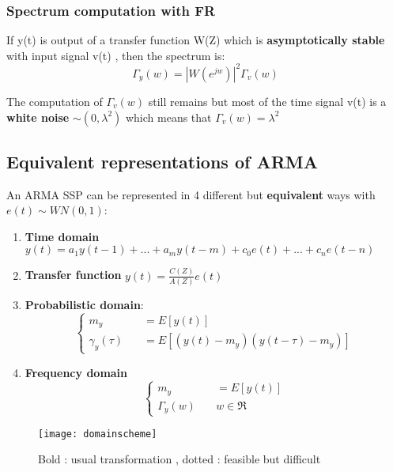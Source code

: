 \subsubsection{Spectrum computation with FR}
If y(t) is output of a transfer function W(Z) which is \textbf{asymptotically stable} with input signal v(t) , then the spectrum is:
\[
 \boxed{ \Gamma_y(w) = |W(e^{jw})|^2 \Gamma_v(w)}
\]

The computation of $\Gamma_v(w)$ still remains but most of the time signal v(t) is a \textbf{white noise} $\sim (0,\lambda^2)$ which means that $\Gamma_v(w) = \lambda^2$


\subsection{Equivalent representations of ARMA}
An ARMA SSP can be represented in 4 different but \textbf{equivalent} ways with $e(t) 
\sim WN(0,1)$:
\begin{enumerate}
\item \textbf{Time domain} $ y(t) = a_1y(t-1)+...+a_my(t-m) +c_0e(t)+...+c_ne(t-n)$
\item \textbf{Transfer function} $ y(t) = \frac{C(Z)}{A(Z)} e(t) $
\item \textbf{Probabilistic domain}:
 \[  
  \begin{cases}
    m_y       & \quad = E[y(t)]\\
    \gamma_y(\tau)  & \quad =  E[(y(t)-m_y)(y(t-\tau)-m_y)]
  \end{cases}
\]
\item \textbf{Frequency domain} 
 \[  
  \begin{cases}
    m_y       & \quad = E[y(t)]\\
    \Gamma_y(w)  & \quad w \in \Re
  \end{cases}
\]
\end{enumerate}

\begin{figure}[H]
 \centering
  \texttt{[image: domainscheme]}
  \caption{Bold : usual transformation , dotted : feasible but difficult}
\end{figure}

